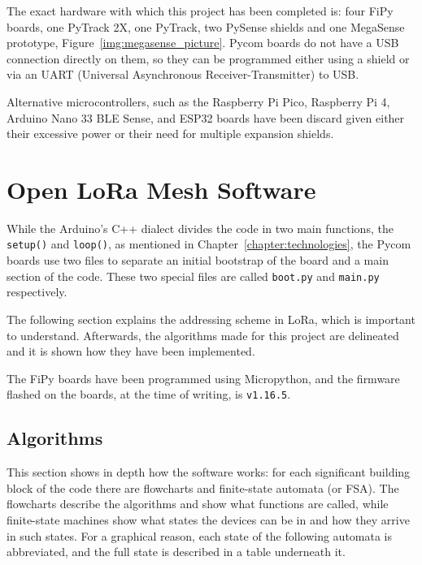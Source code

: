 		The exact hardware with which this project has been completed is: four FiPy boards, one PyTrack 2X, one PyTrack, two PySense shields and one MegaSense prototype, Figure~\ref{img:megasense_picture}.
		Pycom boards do not have a USB connection directly on them, so they can be programmed either using a shield or via an UART (Universal Asynchronous Receiver-Transmitter) to USB.
		
		Alternative microcontrollers, such as the Raspberry Pi Pico, Raspberry Pi 4, Arduino Nano 33 BLE Sense, and ESP32 boards have been discard given either their excessive power or their need for multiple expansion shields.
				
	\section{Open LoRa Mesh Software}\label{sec:software_solution}
	
		While the Arduino's C++ dialect divides the code in two main functions, the \texttt{setup()} and \texttt{loop()}, as mentioned in Chapter~\ref{chapter:technologies}, the Pycom boards use two files to separate an initial bootstrap of the board and a main section of the code.
		These two special files are called \texttt{boot.py} and \texttt{main.py} respectively.
		
		The following section explains the addressing scheme in LoRa, which is important to understand.
		Afterwards, the algorithms made for this project are delineated and it is shown how they have been implemented.
		
		The FiPy boards have been programmed using Micropython, and the firmware flashed on the boards, at the time of writing, is \texttt{v1.16.5}.
		
		\subsection{Algorithms}\label{subsec:algorithms}
	
			

			This section shows in depth how the software works: for each significant building block of the code there are flowcharts and finite-state automata (or FSA).
			The flowcharts describe the algorithms and show what functions are called, while finite-state machines show what states the devices can be in and how they arrive in such states.
			For a graphical reason, each state of the following automata is abbreviated, and the full state is described in a table underneath it.
			
